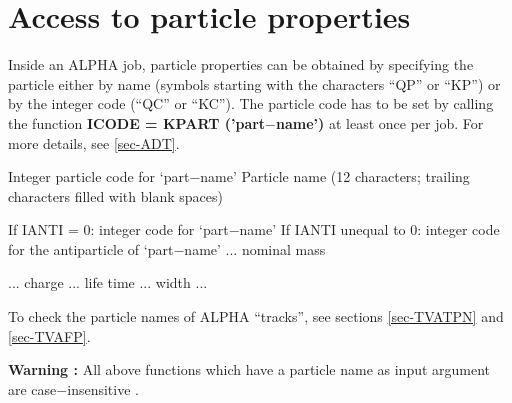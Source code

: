 \section{\label{sec-PTAC}Access to particle properties}
\par
Inside an ALPHA job, particle properties can be obtained by
specifying the particle
either by name (symbols starting with the characters ``QP'' or ``KP'')
or by
the integer code (``QC'' or ``KC''). The particle code has to be set
by calling the function
{\bf ICODE = KPART ('part$-$name')} at least once per job.
For more details, see \ref{sec-ADT}.
\begin{indentlist}{ 5.75cm}{ 6.00cm}
Integer particle code for `part$-$name'
Particle name (12 characters; trailing
characters
filled with blank spaces)
 
If IANTI = 0: integer code for `part$-$name'
If IANTI unequal to  0: integer code for the
antiparticle of `part$-$name'
...
nominal mass
 
...
charge
...
life time
...
width
...
\end{indentlist}
\par
To check the particle names of ALPHA ``tracks'', see sections
\ref{sec-TVATPN} and \ref{sec-TVAFP}.
\par
{\bf Warning :} All above functions which have a particle name as input argument are case$-$insensitive .
 
